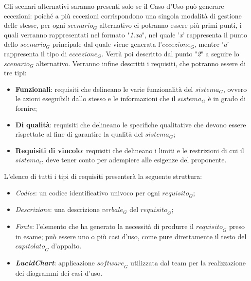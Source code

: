Gli scenari alternativi saranno presenti solo se il Caso d'Uso può generare eccezioni: poiché a più eccezioni corrispondono una singola modalità di gestione delle stesse, per ogni $\textit{scenario}_G$ alternativo ci potranno essere più primi punti, i quali verranno rappresentati nel formato "\textit{1.xa}", nel quale '\textit{x}' rappresenta il punto dello $\textit{scenario}_G$ principale dal quale viene generata l'$\textit{eccezione}_G$, mentre '\textit{a}' rappresenta il tipo di $\textit{eccezione}_G$. Verrà poi descritto dal punto "\textit{2}" a seguire lo $\textit{scenario}_G$ alternativo.
Verranno infine descritti i requisiti, che potranno essere di tre tipi: 
\begin{itemize}
    \item \textbf{Funzionali}: requisiti che delineano le varie funzionalità del $\textit{sistema}_G$, ovvero le azioni eseguibili dallo stesso e le informazioni che il $\textit{sistema}_G$ è in grado di fornire; 
    \item \textbf{Di qualità}: requisiti che delineano le specifiche qualitative che devono essere rispettate al fine di garantire la qualità del $\textit{sistema}_G$; 
    \item \textbf{Requisiti di vincolo}: requisiti che delineano i limiti e le restrizioni di cui il $\textit{sistema}_G$ deve tener conto per adempiere alle esigenze del proponente. 
\end{itemize}
L'elenco di tutti i tipi di requisiti presenterà la seguente struttura: 
\begin{itemize}
    \item \textit{Codice}: un codice identificativo univoco per ogni $\textit{requisito}_G$; 
    \item \textit{Descrizione}: una descrizione $\textit{verbale}_G$ del $\textit{requisito}_G$; 
    \item \textit{Fonte}: l'elemento che ha generato la necessità di produrre il $\textit{requisito}_G$ preso in esame; può essere uno o più casi d'uso, come pure direttamente il testo del $\textit{capitolato}_G$ d'appalto. 
\end{itemize}
\begin{itemize}
    \item \emph{\textbf{LucidChart}}: applicazione $\textit{software}_G$ utilizzata dal team per la realizzazione dei diagrammi dei casi d'uso.
\end{itemize}
